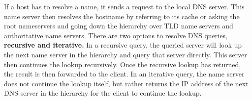 If a host has to resolve a name, it sends a request to the local DNS server. This name server then resolves the hostname by referring to its cache or asking the root nameservers and going down the hierarchy over TLD name servers and authoritative name servers. There are two options to resolve DNS queries, \textbf{recursive and iterative.} In a recursive query, the queried server will look up the next name server in the hierarchy and query that server directly. This server then continues the lookup recursively. Once the recursive lookup has returned, the result is then forwarded to the client. In an iterative query, the name server does not continue the lookup itself, but rather returns the IP address of the next DNS server in the hierarchy for the client to continue the lookup.\vspace{.3cm}\\

